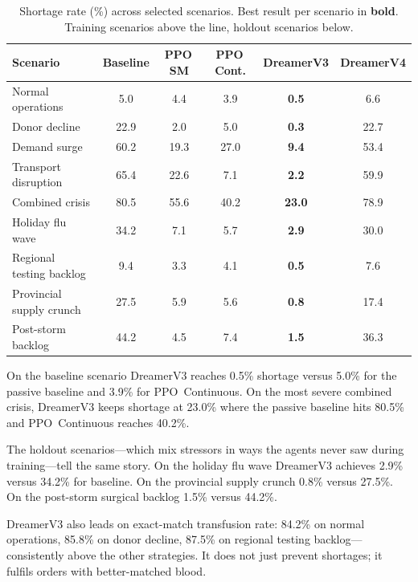 \begin{table}[htbp]
\centering
\caption{Shortage rate (\%) across selected scenarios.  Best result per
         scenario in \textbf{bold}.  Training scenarios above the line,
         holdout scenarios below.}
\label{tab:shortage-comparison}
\small
\begin{tabular}{@{}lccccc@{}}
\toprule
\textbf{Scenario}
    & \textbf{Baseline}
    & \textbf{PPO\,SM}
    & \textbf{PPO\,Cont.}
    & \textbf{DreamerV3}
    & \textbf{DreamerV4} \\
\midrule
Normal operations        &  5.0 &  4.4 &  3.9 & \textbf{0.5}  &  6.6 \\
Donor decline            & 22.9 &  2.0 &  5.0 & \textbf{0.3}  & 22.7 \\
Demand surge             & 60.2 & 19.3 & 27.0 & \textbf{9.4}  & 53.4 \\
Transport disruption     & 65.4 & 22.6 &  7.1 & \textbf{2.2}  & 59.9 \\
Combined crisis          & 80.5 & 55.6 & 40.2 & \textbf{23.0} & 78.9 \\
\midrule
Holiday flu wave         & 34.2 &  7.1 &  5.7 & \textbf{2.9}  & 30.0 \\
Regional testing backlog &  9.4 &  3.3 &  4.1 & \textbf{0.5}  &  7.6 \\
Provincial supply crunch & 27.5 &  5.9 &  5.6 & \textbf{0.8}  & 17.4 \\
Post-storm backlog       & 44.2 &  4.5 &  7.4 & \textbf{1.5}  & 36.3 \\
\bottomrule
\end{tabular}
\end{table}

On the baseline scenario DreamerV3 reaches 0.5\% shortage versus 5.0\% for
the passive baseline and 3.9\% for PPO~Continuous.  On the most severe
combined crisis, DreamerV3 keeps shortage at 23.0\% where the passive
baseline hits 80.5\% and PPO~Continuous reaches 40.2\%.

The holdout scenarios---which mix stressors in ways the agents never saw
during training---tell the same story.  On the holiday flu wave DreamerV3
achieves 2.9\% versus 34.2\% for baseline.  On the provincial supply crunch
0.8\% versus 27.5\%.  On the post-storm surgical backlog 1.5\% versus
44.2\%.

DreamerV3 also leads on exact-match transfusion rate: 84.2\% on normal
operations, 85.8\% on donor decline, 87.5\% on regional testing backlog---
consistently above the other strategies.  It does not just prevent
shortages; it fulfils orders with better-matched blood.

